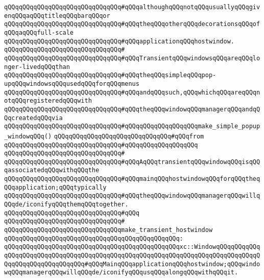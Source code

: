 \verb|qQQqqQQqqQQqqQQqqQQqqQQqqQQqqQQq#qQQqalthoughqQQqnotqQQqusuallyqQQqgivenqQQqaqQQqtitleqQQqbarqQQqor|\newline
\verb|qQQqqQQqqQQqqQQqqQQqqQQqqQQqqQQq#qQQqtheqQQqotherqQQqdecorationsqQQqofqQQqaqQQqfull-scale|\newline
\verb|qQQqqQQqqQQqqQQqqQQqqQQqqQQqqQQq#qQQqapplicationqQQqhostwindow.|\newline
\verb|qQQqqQQqqQQqqQQqqQQqqQQqqQQqqQQq#|\newline
\verb|qQQqqQQqqQQqqQQqqQQqqQQqqQQqqQQq#qQQqTransientqQQqwindowsqQQqareqQQqlonger-livedqQQqthan|\newline
\verb|qQQqqQQqqQQqqQQqqQQqqQQqqQQqqQQq#qQQqtheqQQqsimpleqQQqpop-upqQQqwindowsqQQqusedqQQqforqQQqmenus|\newline
\verb|qQQqqQQqqQQqqQQqqQQqqQQqqQQqqQQq#qQQqandqQQqsuch,qQQqwhichqQQqareqQQqnotqQQqregisteredqQQqwith|\newline
\verb|qQQqqQQqqQQqqQQqqQQqqQQqqQQqqQQq#qQQqtheqQQqwindowqQQqmanagerqQQqandqQQqcreatedqQQqvia|\newline
\verb|qQQqqQQqqQQqqQQqqQQqqQQqqQQqqQQq#qQQqqQQqqQQqqQQqqQQqmake_simple_popup_windowqQQq()|\newline
\verb|qQQqqQQqqQQqqQQqqQQqqQQqqQQqqQQq#qQQqfrom|\newline
\verb|qQQqqQQqqQQqqQQqqQQqqQQqqQQqqQQq#qQQqqQQqqQQqqQQqqQQq|\newline
\verb|qQQqqQQqqQQqqQQqqQQqqQQqqQQqqQQq#|\newline
\verb|qQQqqQQqqQQqqQQqqQQqqQQqqQQqqQQq#qQQqAqQQqtransientqQQqwindowqQQqisqQQqassociatedqQQqwithqQQqthe|\newline
\verb|qQQqqQQqqQQqqQQqqQQqqQQqqQQqqQQq#qQQqmainqQQqhostwindowqQQqforqQQqtheqQQqapplication;qQQqtypically|\newline
\verb|qQQqqQQqqQQqqQQqqQQqqQQqqQQqqQQq#qQQqtheqQQqwindowqQQqmanagerqQQqwillqQQqde/iconifyqQQqthemqQQqtogether.|\newline
\verb|qQQqqQQqqQQqqQQqqQQqqQQqqQQqqQQq#qQQq|\newline
\verb|qQQqqQQqqQQqqQQqqQQqqQQqqQQqqQQq#|\newline
\verb|qQQqqQQqqQQqqQQqqQQqqQQqqQQqqQQqmake_transient_hostwindow|\newline
\verb|qQQqqQQqqQQqqQQqqQQqqQQqqQQqqQQqqQQqqQQqqQQqqQQq:|\newline
\verb|qQQqqQQqqQQqqQQqqQQqqQQqqQQqqQQqqQQqqQQqqQQqqQQqxc::WindowqQQqqQQqqQQqqQQqqQQqqQQqqQQqqQQqqQQqqQQqqQQqqQQqqQQqqQQqqQQqqQQqqQQqqQQqqQQqqQQqqQQqqQQqqQQqqQQqqQQqqQQq#qQQqMainqQQqapplicationqQQqhostwindow;qQQqwindowqQQqmanagerqQQqwillqQQqde/iconifyqQQqusqQQqalongqQQqwithqQQqit.|\newline
